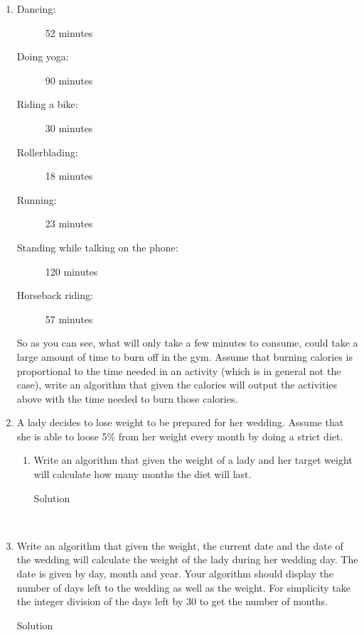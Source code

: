 \documentclass[11pt,a4paper]{article}
\begin{document}
\begin{enumerate}[label=(\alph*)]
  \item
\begin{description}
  \item[Dancing:] 52 minutes
  \item[Doing yoga:] 90 minutes
  \item[Riding a bike:] 30 minutes
  \item[Rollerblading:] 18 minutes
  \item[Running:] 23 minutes
  \item[Standing while talking on the phone:] 120 minutes
  \item[Horseback riding:] 57 minutes
\end{description}

So as you can see, what will only take a few minutes to consume, could take a large amount of time
to burn off in the gym.
Assume that burning calories is proportional to the time needed in an activity (which is in general
not the case), write an algorithm that given the calories will output the activities above with the
time needed to burn those calories.

\newpage
 \item A lady decides to lose weight to be prepared for her wedding. Assume that she is able to loose 5\%
from her weight every month by doing a strict diet.

\begin{enumerate}
  \item Write an algorithm that given the weight of a lady and her target weight will calculate how
many months the diet will last.
\begin{description}
  \item[Solution] \hfill \\
  
\end{description}
\end{enumerate}
\item Write an algorithm that given the weight, the current date and the date of the wedding will
calculate the weight of the lady during her wedding day. The date is given by day, month and
year.
Your algorithm should display the number of days left to the wedding as well as the weight.
For simplicity take the integer division of the days left by 30 to get the number of months.
\begin{description}
  \item[Solution] \hfill \\
   
\end{description}
\end{enumerate}
\end{document}
